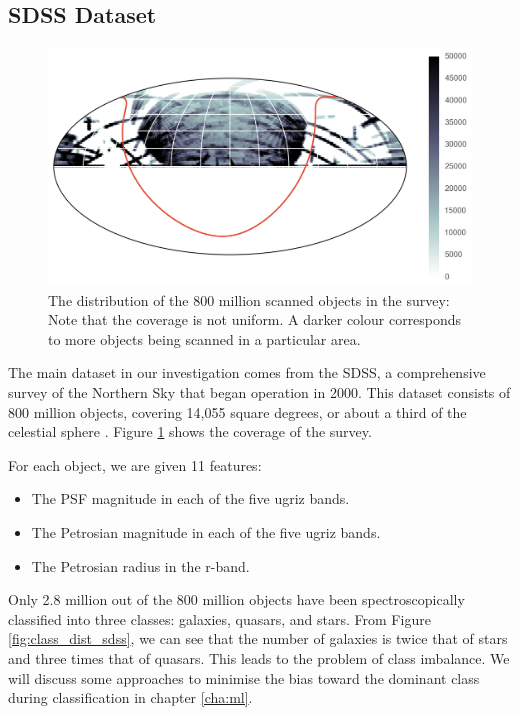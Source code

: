 \subsection{SDSS Dataset} 
\begin{figure}[tbp]
	\centering
	\includegraphics[width=\textwidth]{figures/4_expt1/map_prediction_forest_all}
	\caption[Coverage of the SDSS]{The distribution of the 800 million scanned objects
		in the survey: Note that the coverage is not uniform. A darker colour
		corresponds to more objects being scanned in a particular area.}
	\label{fig:coverage}
\end{figure}

The main dataset in our investigation comes from the SDSS, a comprehensive survey of the
Northern Sky that began operation in 2000. This dataset consists of 800 million objects, covering
14,055 square degrees, or 
about a third of the celestial sphere \cite{alam15}. Figure \ref{fig:coverage} shows the coverage of the survey.

For each object, we are given 11 features:
	\begin{itemize}
		\item The PSF magnitude in each of the five ugriz bands.
		\item The Petrosian magnitude in each of the five ugriz bands.
		\item The Petrosian radius in the r-band.
	\end{itemize}
Only 2.8 million out of the 800 million objects have been spectroscopically classified into three
classes: galaxies, quasars, and stars. From Figure \ref{fig:class_dist_sdss}, we can see that the
number of galaxies is twice that of stars and three times that of quasars. This leads to
the problem of class imbalance. We will discuss some approaches to minimise the bias toward
the dominant class during classification in chapter \ref{cha:ml}.

